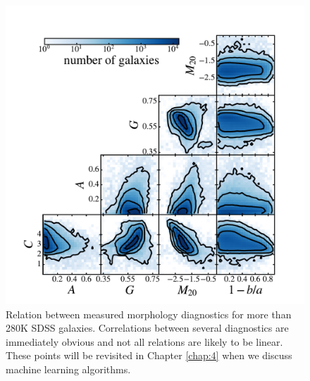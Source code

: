 
\label{tab: morphologies}


\begin{figure}
\includegraphics[width=\textwidth]{Figures/human_machine/A2b.pdf}
\caption[Automated morphologies for the full GZ2 sample.]{Relation between measured morphology diagnostics for more than 280K SDSS galaxies. Correlations between several diagnostics are immediately obvious and not all relations are likely to be linear. These points will be revisited in Chapter \ref{chap:4} when we discuss machine learning algorithms.}
\label{fig: morphs}
\end{figure}